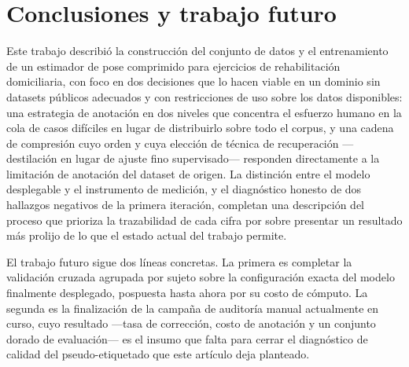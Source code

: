 \documentclass[10pt,a4paper,twocolumn]{article}
\begin{document}
\section{Conclusiones y trabajo futuro}
Este trabajo describió la construcción del conjunto de datos y el
entrenamiento de un estimador de pose comprimido para ejercicios de
rehabilitación domiciliaria, con foco en dos decisiones que lo hacen viable
en un dominio sin datasets públicos adecuados y con restricciones de uso
sobre los datos disponibles: una estrategia de anotación en dos niveles que
concentra el esfuerzo humano en la cola de casos difíciles en lugar de
distribuirlo sobre todo el corpus, y una cadena de compresión cuyo orden y
cuya elección de técnica de recuperación —destilación en lugar de ajuste fino
supervisado— responden directamente a la limitación de anotación del dataset
de origen. La distinción entre el modelo desplegable y el instrumento de
medición, y el diagnóstico honesto de dos hallazgos negativos de la primera
iteración, completan una descripción del proceso que prioriza la
trazabilidad de cada cifra por sobre presentar un resultado más prolijo de lo
que el estado actual del trabajo permite.

El trabajo futuro sigue dos líneas concretas. La primera es completar la
validación cruzada agrupada por sujeto sobre la configuración exacta del
modelo finalmente desplegado, pospuesta hasta ahora por su costo de cómputo.
La segunda es la finalización de la campaña de auditoría manual actualmente
en curso, cuyo resultado —tasa de corrección, costo de anotación y un
conjunto dorado de evaluación— es el insumo que falta para cerrar el
diagnóstico de calidad del pseudo-etiquetado que este artículo deja
planteado.

\begingroup
\fontsize{9}{11}\selectfont


\endgroup
\end{document}
